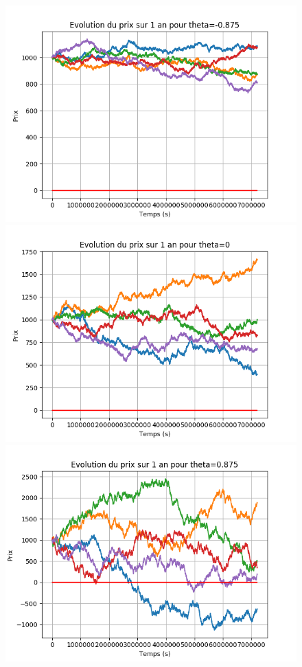 \documentclass[a4paper,11pt]{article}
\begin{document}
\begin{figure}
\begin{center}
\includegraphics[scale=0.5]{"Evolution prix -0875"}
\includegraphics[scale=0.5]{"Evolution prix 0"}
\includegraphics[scale=0.5]{"Evolution prix 0875"}
\end{center}
\end{figure}
\end{document}
